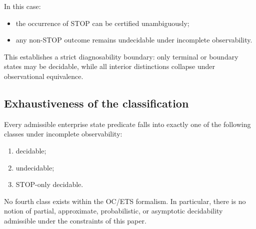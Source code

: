 \noindent
In this case:
\begin{itemize}
\item the occurrence of STOP can be certified unambiguously;
\item any non-STOP outcome remains undecidable under incomplete
      observability.
\end{itemize}

This establishes a strict diagnosability boundary: only terminal or
boundary states may be decidable, while all interior distinctions
collapse under observational equivalence.

\subsection{Exhaustiveness of the classification}
\label{subsec:exhaustiveness}

\begin{proposition}
\label{prop:exhaustive-trichotomy}
Every admissible enterprise state predicate falls into exactly one of
the following classes under incomplete observability:
\begin{enumerate}
\item decidable;
\item undecidable;
\item STOP-only decidable.
\end{enumerate}
\end{proposition}

\noindent
No fourth class exists within the OC/ETS formalism. In particular, there
is no notion of partial, approximate, probabilistic, or asymptotic
decidability admissible under the constraints of this paper.
